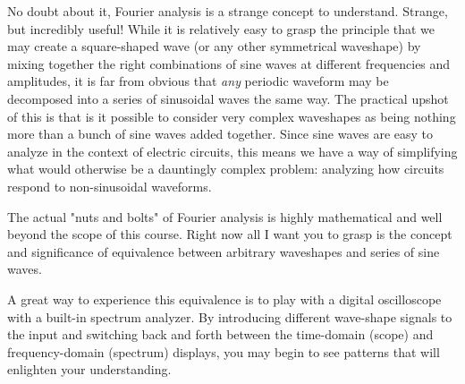 No doubt about it, Fourier analysis is a strange concept to understand.  Strange, but incredibly useful!  While it is relatively easy to grasp the principle that we may create a square-shaped wave (or any other symmetrical waveshape) by mixing together the right combinations of sine waves at different frequencies and amplitudes, it is far from obvious that {\it any} periodic waveform may be decomposed into a series of sinusoidal waves the same way.  The practical upshot of this is that is it possible to consider very complex waveshapes as being nothing more than a bunch of sine waves added together.  Since sine waves are easy to analyze in the context of electric circuits, this means we have a way of simplifying what would otherwise be a dauntingly complex problem: analyzing how circuits respond to non-sinusoidal waveforms.

The actual "nuts and bolts" of Fourier analysis is highly mathematical and well beyond the scope of this course.  Right now all I want you to grasp is the concept and significance of equivalence between arbitrary waveshapes and series of sine waves.

A great way to experience this equivalence is to play with a digital oscilloscope with a built-in spectrum analyzer.  By introducing different wave-shape signals to the input and switching back and forth between the time-domain (scope) and frequency-domain (spectrum) displays, you may begin to see patterns that will enlighten your understanding.




